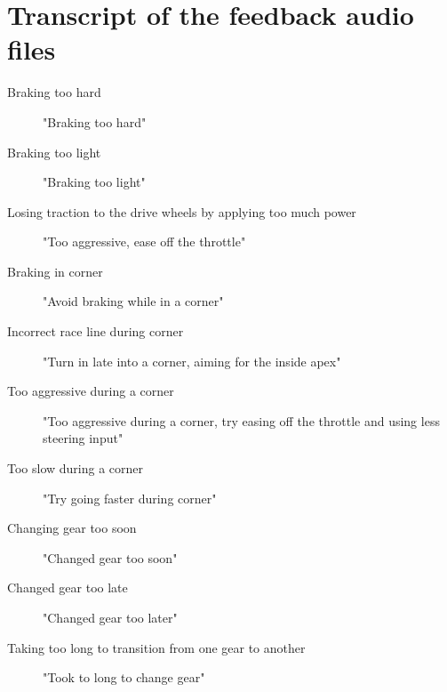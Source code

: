 %
%
%
%
%
%

\section{Transcript of the feedback audio files}

\begin{description}
	\item [Braking too hard] "Braking too hard"
	\item [Braking too light] "Braking too light"
	\item [Losing traction to the drive wheels by applying too much power] "Too aggressive, ease off the throttle"
	\item [Braking in corner] "Avoid braking while in a corner"
	\item [Incorrect race line during corner] "Turn in late into a corner, aiming for the inside apex"
	\item [Too aggressive during a corner] "Too aggressive during a corner, try easing off the throttle and using less steering input"
	\item [Too slow during a corner] "Try going faster during corner"
	\item [Changing gear too soon] "Changed gear too soon"
	\item [Changed gear too late] "Changed gear too later"
	\item [Taking too long to transition from one gear to another] "Took to long to change gear"
\end{description}
